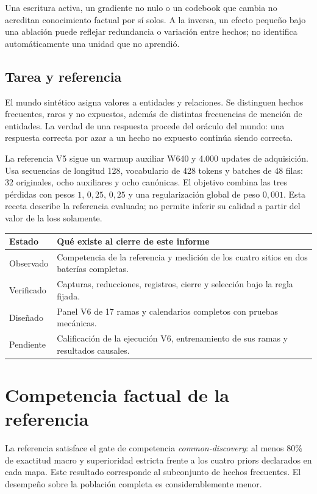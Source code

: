 \documentclass[11pt,a4paper]{article}
\newcommand{\pageend}{\clearpage}
\begin{document}
Una escritura activa, un gradiente no nulo o un codebook que cambia no acreditan
conocimiento factual por sí solos. A la inversa, un efecto pequeño bajo una
ablación puede reflejar redundancia o variación entre hechos; no identifica
automáticamente una unidad que no aprendió.

\subsection{Tarea y referencia}
El mundo sintético asigna valores a entidades y relaciones. Se distinguen hechos
frecuentes, raros y no expuestos, además de distintas frecuencias de mención de
entidades. La verdad de una respuesta procede del oráculo del mundo: una respuesta
correcta por azar a un hecho no expuesto continúa siendo correcta.

La referencia V5 sigue un warmup auxiliar W640 y 4.000 updates de adquisición.
Usa secuencias de longitud 128, vocabulario de 428 tokens y batches de 48 filas:
32 originales, ocho auxiliares y ocho canónicas. El objetivo combina las tres
pérdidas con pesos $1$, $0{,}25$, $0{,}25$ y una regularización global de peso
$0{,}001$. Esta receta describe la referencia evaluada; no permite inferir su
calidad a partir del valor de la loss solamente.

\begin{tabularx}{\linewidth}{@{}p{32mm}Y@{}}
\toprule
\textbf{Estado} & \textbf{Qué existe al cierre de este informe}\\
\midrule
Observado & Competencia de la referencia y medición de los cuatro sitios en dos baterías completas.\\
Verificado & Capturas, reducciones, registros, cierre y selección bajo la regla fijada.\\
Diseñado & Panel V6 de 17 ramas y calendarios completos con pruebas mecánicas.\\
Pendiente & Calificación de la ejecución V6, entrenamiento de sus ramas y resultados causales.\\
\bottomrule
\end{tabularx}

\pageend
\section{Competencia factual de la referencia}
\label{sec:competence}

La referencia satisface el gate de competencia \emph{common-discovery}: al menos
80\% de exactitud macro y superioridad estricta frente a los cuatro priors
declarados en cada mapa. Este resultado corresponde al subconjunto de hechos
frecuentes. El desempeño sobre la población completa es considerablemente menor.
\end{document}
